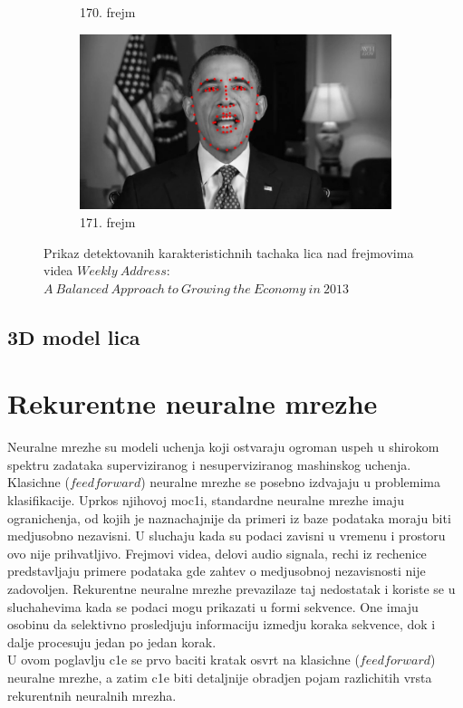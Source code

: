 \documentclass[a4paper, openany, oneside, 11pt]{book}
\begin{document}
\begin{figure}[!h]
\begin{subfigure}{0.475\textwidth}
            \caption{170. frejm}
            \label{fig:2_5c}
            \vspace{0pt}
        \end{subfigure}%
        \begin{subfigure}{0.475\textwidth}
            \centering
            \includegraphics[scale=0.21]{res/171lm.jpg}
            \caption{171. frejm}
            \label{fig:2_5d}
            \vspace{0pt}
        \end{subfigure}
        \caption{Prikaz detektovanih karakteristichnih tachaka lica nad frejmovima videa $Weekly\ Address$: $A\ Balanced\ Approach\ to\ Growing\ the\ Economy\ in\ 2013$}
        \label{fig:2_3}
\end{figure}
\section[$3D$ model lica]{$\mathbf{3D}$ model lica}
\chapter{Rekurentne neuralne mrezhe}
Neuralne mrezhe su modeli uchenja koji ostvaraju ogroman uspeh u shirokom spektru zadataka superviziranog i nesuperviziranog mashinskog uchenja. Klasichne ($feedforward$) neuralne mrezhe se posebno izdvajaju u problemima klasifikacije. Uprkos njihovoj moc1i, standardne neuralne mrezhe imaju ogranichenja, od kojih je naznachajnije da primeri iz baze podataka moraju biti medjusobno nezavisni. U sluchaju kada su podaci zavisni u vremenu i prostoru ovo nije prihvatljivo. Frejmovi videa, delovi audio signala, rechi iz rechenice predstavljaju primere podataka gde zahtev o medjusobnoj nezavisnosti nije zadovoljen. Rekurentne neuralne mrezhe prevazilaze taj nedostatak i koriste se u sluchahevima kada se podaci mogu prikazati u formi sekvence. One imaju osobinu da selektivno prosledjuju informaciju izmedju koraka sekvence, dok i dalje procesuju jedan po jedan korak.\\
U ovom poglavlju c1e se prvo baciti kratak osvrt na klasichne ($feedforward$) neuralne mrezhe, a zatim c1e biti detaljnije obradjen pojam razlichitih vrsta rekurentnih neuralnih mrezha.
\end{document}
